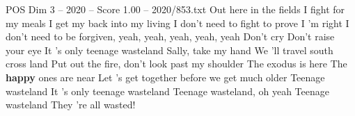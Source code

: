 \begin{textsample}{POS Dim 3 – 2020 – Score 1.00 – 2020/853.txt}  \label{ex:f3_pos_005}
Out here in the fields I fight for my meals I get my back into my living I don't need to fight to prove I 'm right I don't need to be forgiven, yeah, yeah, yeah, yeah, yeah Don't cry Don't raise your eye It 's only teenage wasteland Sally, take my hand We 'll travel south cross land Put out the fire, don't look past my shoulder The exodus is here The \textbf{happy} ones are near Let 's get together before we get much older Teenage wasteland It 's only teenage wasteland Teenage wasteland, oh yeah Teenage wasteland They 're all wasted!

\end{textsample}
